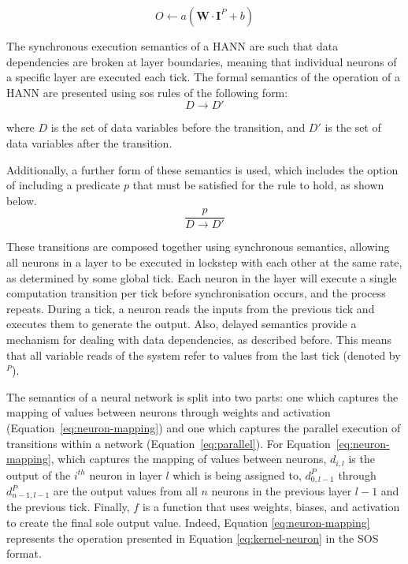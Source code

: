 \begin{equation}
O \leftarrow a(\boldsymbol{W} \cdot \boldsymbol{I}^P + b)
\label{eq:kernel-neuron}
\end{equation}


The synchronous execution semantics of a HANN are such that data dependencies are broken at layer boundaries, meaning that individual neurons of a specific layer are executed each tick. The formal semantics of the operation of a HANN are presented using \gls{sos} rules \cite{plotkin_structural_2004-1} of the following form:
%
\begin{equation}
D \rightarrow D'
\label{eq:sos-form}
\end{equation}

where $D$ is the set of data variables before the transition, and $D'$ is the set of data variables after the transition.

Additionally, a further form of these semantics is used, which includes the option of including a predicate $p$ that must be satisfied for the rule to hold, as shown below.
%
\begin{equation}
\frac{p}{D \rightarrow D'}
\label{eq:sos-predicate-form}
\end{equation}

These transitions are composed together using synchronous semantics, allowing all neurons in a layer to be executed in lockstep with each other at the same rate, as determined by some global tick. Each neuron in the layer will execute a single computation transition per tick before synchronisation occurs, and the process repeats. During a tick, a neuron reads the inputs from the previous tick and executes them to generate the output. Also, delayed semantics provide a mechanism for dealing with data dependencies, as described before. This means that all variable reads of the system refer to values from the last tick (denoted by $^P$).

The semantics of a neural network is split into two parts: one which captures the mapping of values between neurons through weights and activation (Equation~\ref{eq:neuron-mapping}) and one which captures the parallel execution of transitions within a network (Equation~\ref{eq:parallel}). For Equation~\ref{eq:neuron-mapping}, which captures the mapping of values between neurons, $d_{i,l}$ is the output of the $i^{th}$ neuron in layer $l$ which is being assigned to, $d_{0,l-1}^P$ through $d_{n-1,l-1}^P$ are the output values from all $n$ neurons in the previous layer  $l-1$ and the previous tick. Finally, $f$ is a function that uses weights, biases, and activation to create the final sole output value. Indeed, Equation \ref{eq:neuron-mapping} represents the operation presented in Equation \ref{eq:kernel-neuron} in the SOS format.


